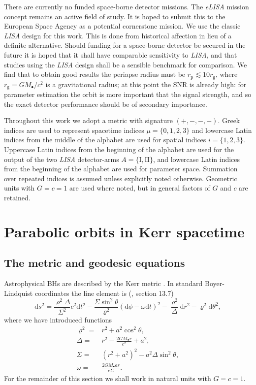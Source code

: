 \documentclass[useAMS,usedcolumn,usegraphicx,usenatbib]{mn2e}
\newcommand{\sub}[1]{\ensuremath{_\mathrm{#1}}}
\newcommand{\dd}{\ensuremath{\mathrm{d}}}
\begin{document}
There are currently no funded space-borne detector missions. The \textit{eLISA} mission concept remains an active field of study. It is hoped to submit this to the European Space Agency as a potential cornerstone mission. We use the classic \textit{LISA} design for this work. This is done from historical affection in lieu of a definite alternative. Should funding for a space-borne detector be secured in the future it is hoped that it shall have comparable sensitivity to \textit{LISA}, and that studies using the \textit{LISA} design shall be a sensible benchmark for comparison. We find that to obtain good results the periapse radius must be $r\sub{p} \lesssim 10 r\sub{g}$, where $r\sub{g} = GM_\bullet / c^2$ is a gravitational radius; at this point the SNR is already high: for parameter estimation the orbit is more important that the signal strength, and so the exact detector performance should be of secondary importance.

Throughout this work we adopt a metric with signature $(+,-,-,-)$. Greek indices are used to represent spacetime indices $\mu = \{0,1,2,3\}$ and lowercase Latin indices from the middle of the alphabet are used for spatial indices $i = \{1,2,3\}$. Uppercase Latin indices from the beginning of the alphabet are used for the output of the two \textit{LISA} detector-arms $A = \{\mathrm{I}, \mathrm{II}\}$, and lowercase Latin indices from the beginning of the alphabet are used for parameter space. Summation over repeated indices is assumed unless explicitly noted otherwise. Geometric units with $G = c = 1$ are used where noted, but in general factors of $G$ and $c$ are retained.

\section{Parabolic orbits in Kerr spacetime}\label{sec:Geodesic}

\subsection{The metric and geodesic equations}

Astrophysical BHs are described by the Kerr metric \citep{Kerr1963}. In standard Boyer-Lindquist coordinates the line element is (\citealt*{Boyer1967, Hobson2006}, section 13.7)
\begin{equation}
\dd s^2 = \frac{\varrho^2 \Delta}{\Sigma^2}c^2\dd t^2 - \frac{\Sigma \sin^2 \theta}{\varrho^2}\left(\dd \phi - \omega \dd t\right)^2 - \frac{\varrho^2}{\Delta}\dd r^2 - \varrho^2\dd \theta^2,
\end{equation}
where we have introduced functions
\begin{align}
\varrho^2 = {} & r^2 + a^2\cos^2\theta,\\
\Delta = {} & r^2 - \frac{2GM_\bullet r}{c^2} + a^2,\\
\Sigma = {} & \left(r^2 +a^2\right)^2 - a^2\Delta\sin^2\theta,\\
\omega = {} & \frac{2GM_\bullet ar}{c\Sigma}.
\end{align}
For the remainder of this section we shall work in natural units with $G = c = 1$.
\end{document}
